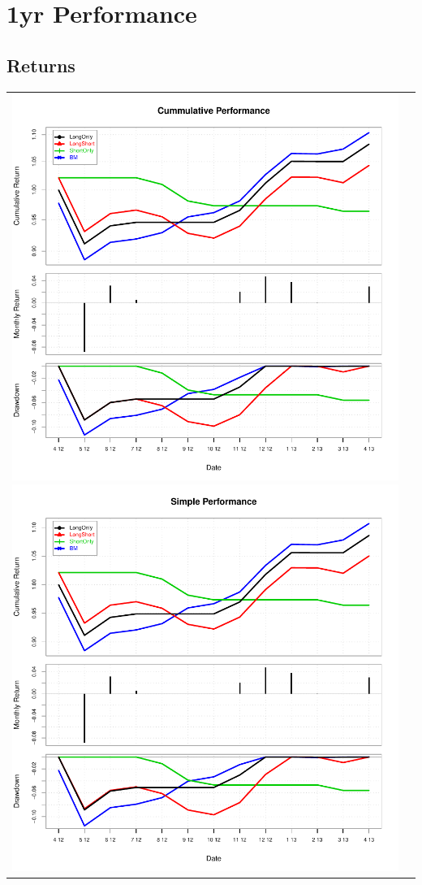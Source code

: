 \documentclass{article}
\begin{document}
\section{1yr Performance}
\subsection{Returns}
\begin{tabular}{cc}
\includegraphics{graphics/plot-016}
\includegraphics{graphics/plot-017}
\end{tabular}
\end{document}

